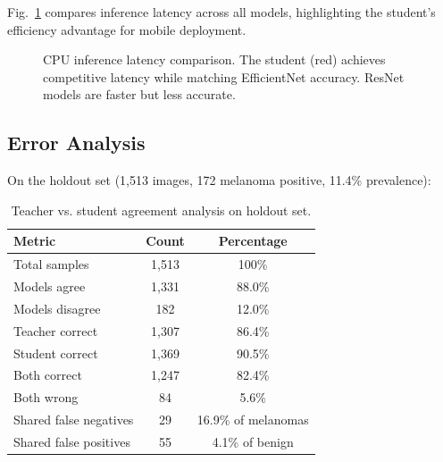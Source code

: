\documentclass[conference]{IEEEtran}
\begin{document}
Fig.~\ref{fig:latency} compares inference latency across all models, highlighting the student's efficiency advantage for mobile deployment.

\begin{figure}[t]
\centering
{}
\caption{CPU inference latency comparison. The student (red) achieves competitive latency while matching EfficientNet accuracy. ResNet models are faster but less accurate.}
\label{fig:latency}
\end{figure}

\subsection{Error Analysis}

On the holdout set (1,513 images, 172 melanoma positive, 11.4\% prevalence):

\begin{table}[t]
\centering
\caption{Teacher vs. student agreement analysis on holdout set.}
\label{tab:agreement}
\begin{tabular}{lcc}
\toprule
\textbf{Metric} & \textbf{Count} & \textbf{Percentage} \\
\midrule
Total samples & 1,513 & 100\% \\
Models agree & 1,331 & 88.0\% \\
Models disagree & 182 & 12.0\% \\
\midrule
Teacher correct & 1,307 & 86.4\% \\
Student correct & 1,369 & 90.5\% \\
Both correct & 1,247 & 82.4\% \\
Both wrong & 84 & 5.6\% \\
\midrule
Shared false negatives & 29 & 16.9\% of melanomas \\
Shared false positives & 55 & 4.1\% of benign \\
\bottomrule
\end{tabular}
\end{table}
\end{document}
